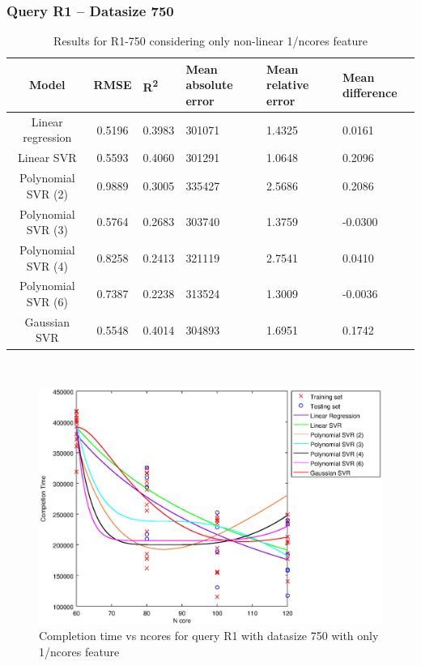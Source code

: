 \documentclass[a4paper,11pt]{article}
\begin{document}
\newpage
\subsubsection{Query R1 -- Datasize 750}
\begin{table}[H]
	\centering
	\begin{adjustbox}{center}
		\begin{tabular}{c | c M{1.2cm} M{2.5cm} M{2.5cm} M{1.8cm}}
			Model & RMSE & R\textsuperscript{2} & Mean absolute error & Mean relative error & Mean difference \tabularnewline
			\hline
			Linear regression & 0.5196 & 0.3983 & 301071 & 1.4325 & 0.0161 \\
			Linear SVR & 0.5593 & 0.4060 & 301291 & 1.0648 & 0.2096 \\
			Polynomial SVR (2) & 0.9889 & 0.3005 & 335427 & 2.5686 & 0.2086 \\
			Polynomial SVR (3) & 0.5764 & 0.2683 & 303740 & 1.3759 & -0.0300 \\
			Polynomial SVR (4) & 0.8258 & 0.2413 & 321119 & 2.7541 & 0.0410 \\
			Polynomial SVR (6) & 0.7387 & 0.2238 & 313524 & 1.3009 & -0.0036 \\
			Gaussian SVR & 0.5548 & 0.4014 & 304893 & 1.6951 & 0.1742 \\
		\end{tabular}
	\end{adjustbox}
	\\
	\caption{Results for R1-750 considering only non-linear 1/ncores feature}
	\label{table_R1_prediction_all}
\end{table}

\begin {figure}[hbtp]
\centering
\includegraphics[width=\textwidth]{output/R1_750_ONLY_1_OVER_NCORES/plot_R1_750.eps}
\caption {Completion time vs ncores for query R1 with datasize 750 with only 1/ncores feature}
\end {figure}
\end{document}
